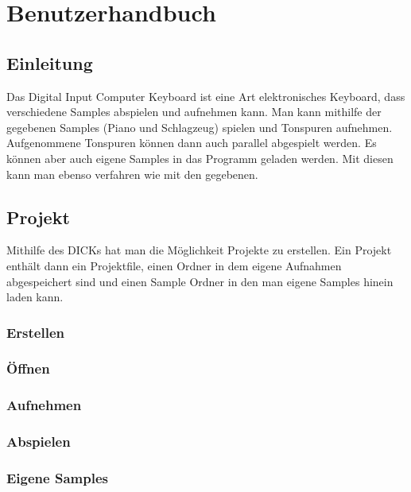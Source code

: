 \section{Benutzerhandbuch}
\subsection{Einleitung}

Das Digital Input Computer Keyboard ist eine Art elektronisches Keyboard, dass verschiedene Samples abspielen und aufnehmen kann. Man kann mithilfe der gegebenen Samples (Piano und Schlagzeug) spielen und Tonspuren aufnehmen. Aufgenommene Tonspuren können dann auch parallel abgespielt werden. Es können aber auch eigene Samples in das Programm geladen werden. Mit diesen kann man ebenso verfahren wie mit den gegebenen.
\subsection{Projekt}

Mithilfe des DICKs hat man die Möglichkeit Projekte zu erstellen. Ein Projekt enthält dann ein Projektfile, einen Ordner in dem eigene Aufnahmen abgespeichert sind und einen Sample Ordner in den man eigene Samples hinein laden kann.


\subsubsection{Erstellen}
\subsubsection{Öffnen}
\subsubsection{Aufnehmen}
\subsubsection{Abspielen}
\subsubsection{Eigene Samples}